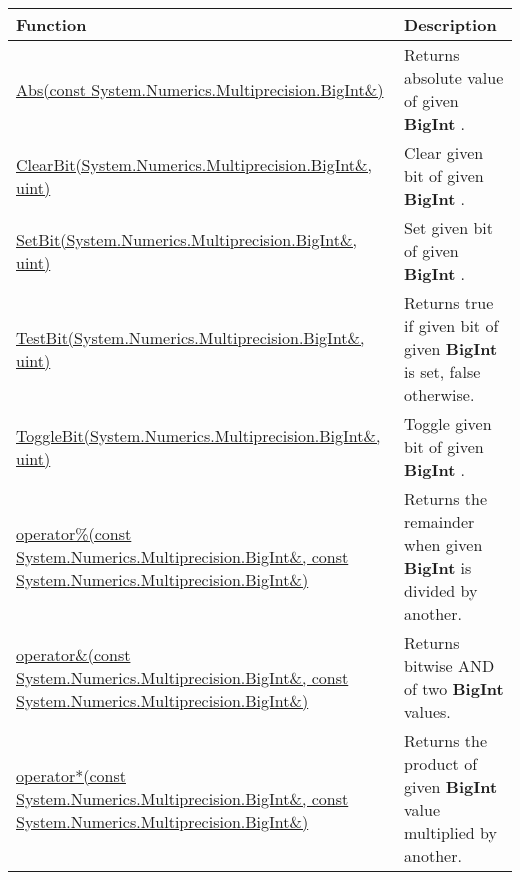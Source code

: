 \documentclass[a4paper,oneside,11.000000pt]{book}
\begin{document}
\begin{flushleft}
\begin{supertabular}[l]{!{\raggedright}p{7.575cm}!{\raggedright}p{7.575cm}}
\textbf{Function}
& \textbf{Description}
\\
\hline
\hyperlink{System.Numerics.Multiprecision.Abs.C.R.System.Numerics.Multiprecision.BigInt}{Abs(const System.\-Numerics.\-Multiprecision.\-BigInt\&\-)}
& Returns absolute value of given \textbf{BigInt}
.

\\
\hyperlink{System.Numerics.Multiprecision.ClearBit.R.System.Numerics.Multiprecision.BigInt.uint}{ClearBit(System.\-Numerics.\-Multiprecision.\-BigInt\&\-, uint)}
& Clear given bit of given \textbf{BigInt}
.

\\
\hyperlink{System.Numerics.Multiprecision.SetBit.R.System.Numerics.Multiprecision.BigInt.uint}{SetBit(System.\-Numerics.\-Multiprecision.\-BigInt\&\-, uint)}
& Set given bit of given \textbf{BigInt}
.

\\
\hyperlink{System.Numerics.Multiprecision.TestBit.R.System.Numerics.Multiprecision.BigInt.uint}{TestBit(System.\-Numerics.\-Multiprecision.\-BigInt\&\-, uint)}
& Returns true if given bit of given \textbf{BigInt}
 is set, false otherwise.

\\
\hyperlink{System.Numerics.Multiprecision.ToggleBit.R.System.Numerics.Multiprecision.BigInt.uint}{ToggleBit(System.\-Numerics.\-Multiprecision.\-BigInt\&\-, uint)}
& Toggle given bit of given \textbf{BigInt}
.

\\
\hyperlink{System.Numerics.Multiprecision.operator.remainder.C.R.System.Numerics.Multiprecision.BigInt.C.R.System.Numerics.Multiprecision.BigInt}{operator\%(const System.\-Numerics.\-Multiprecision.\-BigInt\&\-, const System.\-Numerics.\-Multiprecision.\-BigInt\&\-)}
& Returns the remainder when given \textbf{BigInt}
 is divided by another.

\\
\hyperlink{System.Numerics.Multiprecision.operator.and.C.R.System.Numerics.Multiprecision.BigInt.C.R.System.Numerics.Multiprecision.BigInt}{operator\&\-(const System.\-Numerics.\-Multiprecision.\-BigInt\&\-, const System.\-Numerics.\-Multiprecision.\-BigInt\&\-)}
& Returns bitwise AND of two \textbf{BigInt}
 values.

\\
\hyperlink{System.Numerics.Multiprecision.operator.times.C.R.System.Numerics.Multiprecision.BigInt.C.R.System.Numerics.Multiprecision.BigInt}{operator*(const System.\-Numerics.\-Multiprecision.\-BigInt\&\-, const System.\-Numerics.\-Multiprecision.\-BigInt\&\-)}
& Returns the product of given \textbf{BigInt}
 value multiplied by another.


\end{supertabular}
\end{flushleft}
\end{document}

